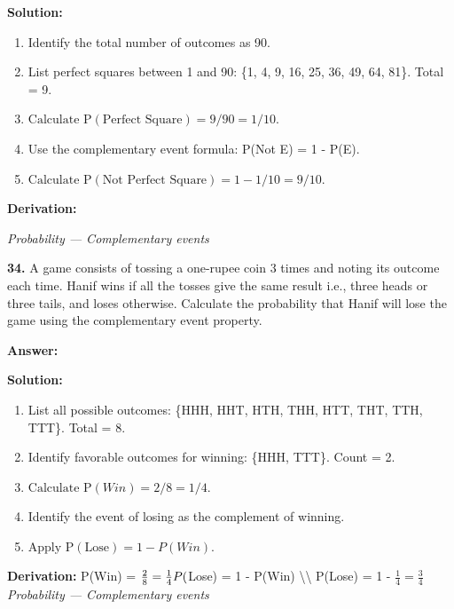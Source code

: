 \documentclass[12pt,a4paper]{exam}
\newcommand{\fitmath}[1]{%
  \sbox{\schmathbox}{$\displaystyle #1$}%
  \ifdim\wd\schmathbox>\linewidth
    \resizebox{\linewidth}{!}{\usebox{\schmathbox}}%
  \else
    \usebox{\schmathbox}%
  \fi}
\begin{document}
\begin{questions}
\textbf{Solution:}
\begin{enumerate}
  \item Identify the total number of outcomes as 90.
  \item List perfect squares between 1 and 90: \{1, 4, 9, 16, 25, 36, 49, 64, 81\}. Total = 9.
  \item \(
\text{Calculate P}(\text{Perfect Square}) = 9/90 = 1/10.
\)
  \item Use the complementary event formula: P(Not E) = 1 - P(E).
  \item \(
\text{Calculate P}(\text{Not Perfect Square}) = 1 - 1/10 = 9/10.
\)
\end{enumerate}
\textbf{Derivation:}
\begin{center}
\fitmath{\begin{aligned}
P(E) = \frac{9}{90} = \frac{1}{10} \\
P(\bar{E}) = 1 - P(E) \\
P(\bar{E}) = 1 - \frac{1}{10} = \frac{9}{10}
\end{aligned}}
\end{center}
\hfill \textit{Probability — Complementary events}
\vspace{0.3cm}

\question \textbf{34.} A game consists of tossing a one-rupee coin 3 times and noting its outcome each time. Hanif wins if all the tosses give the same result i.e., three heads or three tails, and loses otherwise. Calculate the probability that Hanif will lose the game using the complementary event property.

\textbf{Answer:}
\begin{center}
\fitmath{3/4}
\end{center}

\textbf{Solution:}
\begin{enumerate}
  \item List all possible outcomes: \{HHH, HHT, HTH, THH, HTT, THT, TTH, TTT\}. Total = 8.
  \item Identify favorable outcomes for winning: \{HHH, TTT\}. Count = 2.
  \item \(
\text{Calculate P}(Win) = 2/8 = 1/4.
\)
  \item Identify the event of losing as the complement of winning.
  \item \(
\text{Apply P}(\text{Lose}) = 1 - P(Win).
\)
\end{enumerate}
\textbf{Derivation:}
P(Win) = $\frac{2}{8} = \frac{1}{4} \\ P($Lose) = 1 - P(Win) \textbackslash{}\textbackslash{} P(Lose) = 1 - $\frac{1}{4} = \frac{3}{4}$
\hfill \textit{Probability — Complementary events}
\vspace{0.3cm}


\end{questions}
\end{document}
